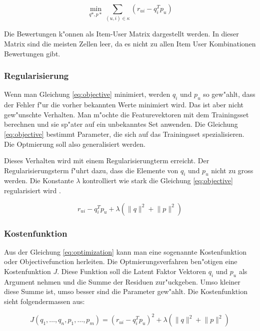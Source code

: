 \documentclass[a4paper, 12pt]{article}
\begin{document}
\begin{equation}
  \label{eq:objective}
  \min_{q*,p*} \sum_{(u,i) \in \kappa} (r_{ui} - q_i^T p_u)
\end{equation}

 Die Bewertungen k"onnen als Item-User Matrix dargestellt werden. In dieser Matrix sind die meisten Zellen leer, da es nicht zu allen Item User Kombinationen Bewertungen gibt. 


\subsubsection{Regularisierung}
\label{sec:regularization}

Wenn man Gleichung \ref{eq:objective} minimiert, werden $q_i$ und $p_u$ so gew"ahlt, dass der Fehler f"ur die vorher bekannten Werte minimiert wird. Das ist aber nicht gew"unschte Verhalten. Man m"ochte die Featurevektoren mit dem Trainingsset berechnen und sie sp"ater auf ein unbekanntes Set anwenden. Die Gleichung \ref{eq:objective} bestimmt Parameter, die sich auf das Trainingsset spezialisieren. Die Optmierung soll also generalisiert werden.

 Dieses Verhalten wird mit einem Regularisierungterm erreicht. Der Regularisierungsterm f"uhrt dazu, dass die Elemente von $q_i$ und $p_u$ nicht zu gross werden. Die Konstante $\lambda$ kontrolliert wie stark die Gleichung \ref{eq:objective} regularisiert wird \cite{koren2009}.

\begin{equation}
  \label{eq:optimization}
    r_{ui} - q_i^T p_u + \lambda (\lVert q \rVert^2 + \lVert p \lVert ^2)
\end{equation}

\subsubsection{Kostenfunktion}
\label{sec:opt}

Aus der Gleichung \ref{eq:optimization} kann man eine sogenannte Kostenfunktion oder Objectivefunction herleiten. Die Optmierungsverfahren ben"otigen eine Kostenfunktion $J$. Diese Funktion soll die Latent Faktor Vektoren $q_i$ und $p_u$ als Argument nehmen und die Summe der Residuen zur"uckgeben. Umso kleiner diese Summe ist, umso besser sind die Parameter gew"ahlt. Die Kostenfunktion sieht folgendermassen aus:

\begin{equation}
  \label{eq:costfunction}
  J(q_1, \dots , q_n, p_1, \dots, p_m) =  (r_{ui} - q_i^T p_u)^2 + \lambda (\lVert q \rVert^2 + \lVert p \lVert ^2)
\end{equation}
\end{document}
